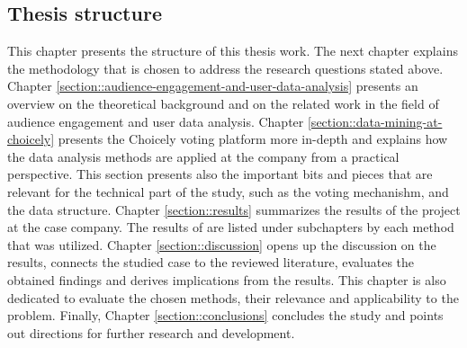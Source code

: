 \subsection{Thesis structure}
    This chapter presents the structure of this thesis work. The next chapter explains the methodology that is chosen to address the research questions stated above. Chapter \ref{section::audience-engagement-and-user-data-analysis} presents an overview on the theoretical background and on the related work in the field of audience engagement and user data analysis. Chapter \ref{section::data-mining-at-choicely} presents the Choicely voting platform more in-depth and explains how the data analysis methods are applied at the company from a practical perspective. This section presents also the important bits and pieces that are relevant for the technical part of the study, such as the voting mechanishm, and the data structure. Chapter \ref{section::results} summarizes the results of the project at the case company. The results of are listed under subchapters by each method that was utilized. Chapter \ref{section::discussion} opens up the discussion on the results, connects the studied case to the reviewed literature, evaluates the obtained findings and derives implications from the results. This chapter is also dedicated to evaluate the chosen methods, their relevance and applicability to the problem. Finally, Chapter \ref{section::conclusions} concludes the study and points out directions for further research and development. 